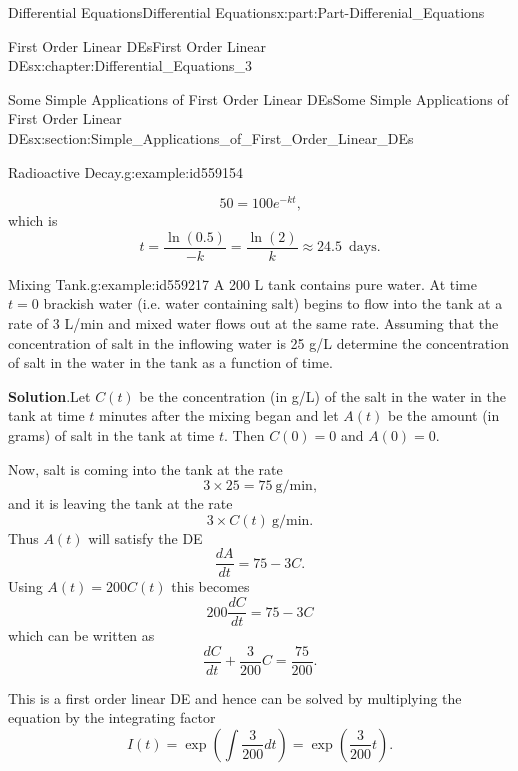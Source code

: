 \documentclass[oneside,10pt,]{book}
\newcommand{\blocktitlefont}{\relax}
\numberwithin{equation}{section}
\begin{document}
\begin{partptx}{Differential Equations}{}{Differential Equations}{}{}{x:part:Part-Differenial_Equations}
\begin{chapterptx}{First Order Linear DEs}{}{First Order Linear DEs}{}{}{x:chapter:Differential_Equations_3}
\begin{sectionptx}{Some Simple Applications of First Order Linear DEs}{}{Some Simple Applications of First Order Linear DEs}{}{}{x:section:Simple_Applications_of_First_Order_Linear_DEs}
\begin{example}{Radioactive Decay.}{g:example:id559154}
\begin{enumerate}[label=\alph*]
\begin{equation*}
50 = 100 e^{-kt}\text{,}
\end{equation*}
which is%
\begin{equation*}
t = \dfrac{\ln(0.5)}{-k} = \dfrac{\ln(2)}{k} \approx 24.5 \, \text{ days}\text{.}
\end{equation*}
%
\end{enumerate}
%
\end{example}
\begin{example}{Mixing Tank.}{g:example:id559217}%
A 200 L tank contains pure water. At time \(t=0\) brackish water (i.e. water containing salt) begins to flow into the tank at a rate of 3 L\slash{}min and mixed water flows out at the same rate. Assuming that the concentration of salt in the inflowing water is 25 g\slash{}L determine the concentration of salt in the water in the tank as a function of time.%
\par\smallskip%
\noindent\textbf{\blocktitlefont Solution}.\hypertarget{g:solution:id559248}{}\quad{}Let \(C(t)\) be the concentration (in g\slash{}L) of the salt in the water in the tank at time \(t\) minutes after the mixing began and let \(A(t)\) be the amount (in grams) of salt in the tank at time \(t\). Then \(C(0) = 0\) and \(A(0) = 0\).%
\par
Now, salt is coming into the tank at the rate%
\begin{equation*}
3 \times 25 = 75 \: \text{g/min}\text{,}
\end{equation*}
and it is leaving the tank at the rate%
\begin{equation*}
3 \times C(t) \: \text{g/min}\text{.}
\end{equation*}
Thus \(A(t)\) will satisfy the DE%
\begin{equation*}
\dfrac{dA}{dt} = 75 - 3C\text{.}
\end{equation*}
Using \(A(t) = 200 C(t)\) this becomes%
\begin{equation*}
200 \dfrac{dC}{dt} = 75 - 3C
\end{equation*}
which can be written as%
\begin{equation*}
\dfrac{dC}{dt} + \dfrac{3}{200}C = \dfrac{75}{200}\text{.}
\end{equation*}
%
\par
This is a first order linear DE and hence can be solved by multiplying the equation by the integrating factor%
\begin{equation*}
I(t) = \exp \left( \displaystyle \int \frac{3}{200} dt \right) = \exp \left( \dfrac{3}{200}t \right)\text{.}
\end{equation*}

\end{example}
\end{sectionptx}
\end{chapterptx}
\end{partptx}
\end{document}
